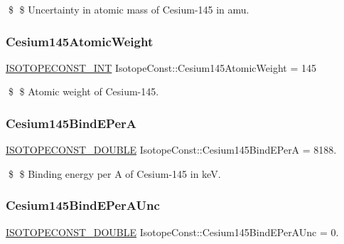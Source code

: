 \$ \$ Uncertainty in atomic mass of Cesium-\/145 in amu. \mbox{\label{group___isotope_const-_cesium-_cs145_ga3c8600741d06a92a66577312878e33ef}} 
\subsubsection{\texorpdfstring{Cesium145\+Atomic\+Weight}{Cesium145AtomicWeight}}
{\footnotesize\ttfamily \mbox{\hyperlink{group___isotope_const-_macros_ga5f18360b3e99483a35c32d789e62621c}{I\+S\+O\+T\+O\+P\+E\+C\+O\+N\+S\+T\+\_\+\+I\+NT}} Isotope\+Const\+::\+Cesium145\+Atomic\+Weight = 145}

\$ \$ Atomic weight of Cesium-\/145. \mbox{\label{group___isotope_const-_cesium-_cs145_ga74b471647e3d94e7dc9a8298768090d4}} 
\subsubsection{\texorpdfstring{Cesium145\+Bind\+E\+PerA}{Cesium145BindEPerA}}
{\footnotesize\ttfamily \mbox{\hyperlink{group___isotope_const-_macros_ga8f45a7272ce02c0b4c65c44636ed719a}{I\+S\+O\+T\+O\+P\+E\+C\+O\+N\+S\+T\+\_\+\+D\+O\+U\+B\+LE}} Isotope\+Const\+::\+Cesium145\+Bind\+E\+PerA = 8188.}

\$ \$ Binding energy per A of Cesium-\/145 in keV. \mbox{\label{group___isotope_const-_cesium-_cs145_ga0a52384650414f2c68574f0dc0f0ae59}} 
\subsubsection{\texorpdfstring{Cesium145\+Bind\+E\+Per\+A\+Unc}{Cesium145BindEPerAUnc}}
{\footnotesize\ttfamily \mbox{\hyperlink{group___isotope_const-_macros_ga8f45a7272ce02c0b4c65c44636ed719a}{I\+S\+O\+T\+O\+P\+E\+C\+O\+N\+S\+T\+\_\+\+D\+O\+U\+B\+LE}} Isotope\+Const\+::\+Cesium145\+Bind\+E\+Per\+A\+Unc = 0.}

